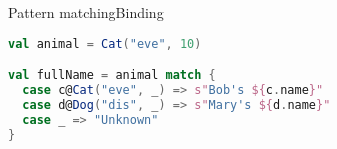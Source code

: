 \documentclass[aspectratio=169]{beamer}
\begin{document}
\begin{frame}[fragile]{Pattern matching}{Binding}
\begin{lstlisting}[style=scala,language=scala]
val animal = Cat("eve", 10)

val fullName = animal match {
  case c@Cat("eve", _) => s"Bob's ${c.name}"
  case d@Dog("dis", _) => s"Mary's ${d.name}"
  case _ => "Unknown"
}
\end{lstlisting}
\end{frame}




\end{document}
